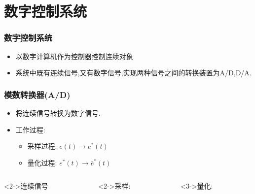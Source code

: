 \documentclass[table]{beamer}
\begin{document}
\section{数字控制系统}
\label{sec-3}
\begin{frame}
\frametitle{数字控制系统}
\label{sec-3-1}

\begin{itemize}
\item 以数字计算机作为控制器控制连续对象
\item 系统中既有连续信号,又有数字信号,实现两种信号之间的转换装置为A/D,D/A.
\end{itemize}
\end{frame}
\begin{frame}
\frametitle{模数转换器(A/D)}
\label{sec-3-2}

\begin{itemize}
\item 将连续信号转换为数字信号.
\item <2->工作过程:
\begin{itemize}
\item <2->采样过程:  $e(t)\rightarrow e^*(t)$
\item <3->量化过程:  $e^*(t)\rightarrow \bar{e}^*(t)$
\end{itemize}
\end{itemize}
\begin{columns}
\begin{column}{0.35\textwidth}
\begin{block}<2->{连续信号}
\label{sec-3-2-1}

\end{block}
\end{column}
\begin{column}{0.35\textwidth}
\begin{block}<2->{采样:}
\label{sec-3-2-2}

\end{block}
\end{column}
\begin{column}{0.35\textwidth}
\begin{block}<3->{量化:}
\label{sec-3-2-3}


\end{block}
\end{column}
\end{columns}
\end{frame}
\end{document}
